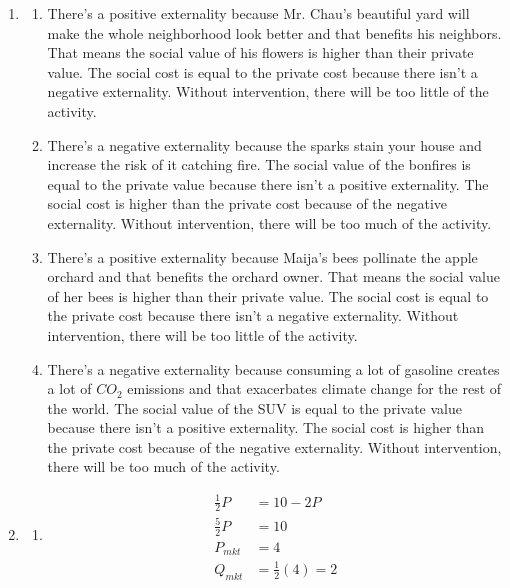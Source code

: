 \documentclass{article}
\begin{document}
\begin{enumerate}

\item

	\begin{enumerate}
	
	\item There's a positive externality because Mr. Chau's beautiful yard will make the whole neighborhood look better and that benefits his neighbors. That means the social value of his flowers is higher than their private value. The social cost is equal to the private cost because there isn't a negative externality. Without intervention, there will be too little of the activity.
	
	\item There's a negative externality because the sparks stain your house and increase the risk of it catching fire. The social value of the bonfires is equal to the private value because there isn't a positive externality. The social cost is higher than the private cost because of the negative externality. Without intervention, there will be too much of the activity.
	
	\item There's a positive externality because Maija's bees pollinate the apple orchard and that benefits the orchard owner. That means the social value of her bees is higher than their private value. The social cost is equal to the private cost because there isn't a negative externality. Without intervention, there will be too little of the activity.
	
	\item There's a negative externality because consuming a lot of gasoline creates a lot of $CO_2$ emissions and that exacerbates climate change for the rest of the world. The social value of the SUV is equal to the private value because there isn't a positive externality. The social cost is higher than the private cost because of the negative externality. Without intervention, there will be too much of the activity.
		
	\end{enumerate}
	
\item

	\begin{enumerate}
	
	\item	\begin{align*}
		\frac{1}{2}P &= 10 - 2P \\
		\frac{5}{2}P & = 10 \\
		P_{mkt} &= 4 \\
		Q_{mkt} &= \frac{1}{2}(4) = 2
		\end{align*}
		

\end{enumerate}
\end{enumerate}
\end{document}
